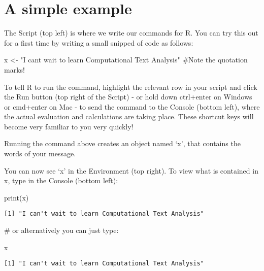 \documentclass[
  letterpaper,
  DIV=11,
  numbers=noendperiod]{scrreprt}
\newenvironment{Shaded}{\begin{snugshade}}{\end{snugshade}}
\newcommand{\CommentTok}[1]{\textcolor[rgb]{0.37,0.37,0.37}{#1}}
\newcommand{\FunctionTok}[1]{\textcolor[rgb]{0.28,0.35,0.67}{#1}}
\newcommand{\NormalTok}[1]{\textcolor[rgb]{0.00,0.23,0.31}{#1}}
\newcommand{\OtherTok}[1]{\textcolor[rgb]{0.00,0.23,0.31}{#1}}
\newcommand{\StringTok}[1]{\textcolor[rgb]{0.13,0.47,0.30}{#1}}
\begin{document}
\hypertarget{a-simple-example}{%
\section*{A simple example}\label{a-simple-example}}

The Script (top left) is where we write our commands for R. You can try
this out for a first time by writing a small snipped of code as follows:

\begin{Shaded}
\begin{Highlighting}[]
\NormalTok{x }\OtherTok{\textless{}{-}} \StringTok{"I can\textquotesingle{}t wait to learn Computational Text Analysis"} \CommentTok{\#Note the quotation marks!}
\end{Highlighting}
\end{Shaded}

To tell R to run the command, highlight the relevant row in your script
and click the Run button (top right of the Script) - or hold down
ctrl+enter on Windows or cmd+enter on Mac - to send the command to the
Console (bottom left), where the actual evaluation and calculations are
taking place. These shortcut keys will become very familiar to you very
quickly!

Running the command above creates an object named `x', that contains the
words of your message.

You can now see `x' in the Environment (top right). To view what is
contained in x, type in the Console (bottom left):

\begin{Shaded}
\begin{Highlighting}[]
\FunctionTok{print}\NormalTok{(x)}
\end{Highlighting}
\end{Shaded}

\begin{verbatim}
[1] "I can't wait to learn Computational Text Analysis"
\end{verbatim}

\begin{Shaded}
\begin{Highlighting}[]
\CommentTok{\# or alternatively you can just type:}

\NormalTok{x}
\end{Highlighting}
\end{Shaded}

\begin{verbatim}
[1] "I can't wait to learn Computational Text Analysis"
\end{verbatim}
\end{document}
